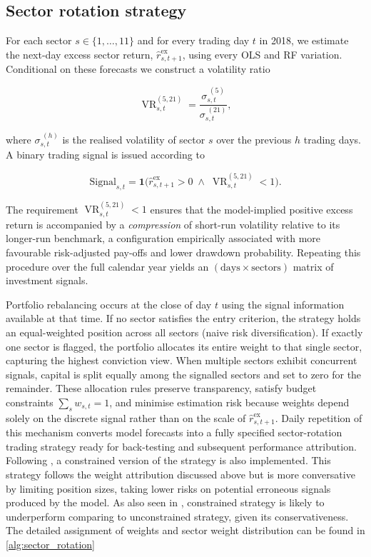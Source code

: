 \subsection{Sector rotation strategy}

For each sector $s\in\{1,\dots,11\}$ and for every trading day $t$ in 2018, we estimate the next-day excess sector return, $\widehat{r}^{\text{ex}}_{s,t+1}$, using every OLS and RF variation. Conditional on these forecasts we construct a volatility ratio

\begin{equation}
\operatorname{VR}_{s,t}^{(5,21)}=\frac{\sigma_{s,t}^{\;(5)}}{\sigma_{s,t}^{\;(21)}},
\end{equation}

where $\sigma_{s,t}^{\;(h)}$ is the realised volatility of sector $s$ over the previous $h$ trading days.  A binary trading signal is issued according to

\begin{equation}
\text{Signal}_{s,t}=\mathbf{1}
\!\bigl(
\widehat{r}^{\text{ex}}_{s,t+1}>0
\;\wedge\;
\operatorname{VR}_{s,t}^{(5,21)}<1
\bigr).
\end{equation}

The requirement $\operatorname{VR}_{s,t}^{(5,21)}<1$ ensures that the model-implied positive excess return is accompanied by a \emph{compression} of short-run volatility relative to its longer-run benchmark, a configuration empirically associated with more favourable risk-adjusted pay-offs and lower drawdown probability.  Repeating this procedure over the full calendar year yields an $(\text{days}\times\text{sectors})$ matrix of investment signals.

Portfolio rebalancing occurs at the close of day $t$ using the signal information available at that time.  If no sector satisfies the entry criterion, the strategy holds an equal-weighted position across all sectors (naive risk diversification).  If exactly one sector is flagged, the portfolio allocates its entire weight to that single sector, capturing the highest conviction view.  When multiple sectors exhibit concurrent signals, capital is split equally among the signalled sectors and set to zero for the remainder. These allocation rules preserve transparency, satisfy budget constraints $\sum_{s}w_{s,t}=1$, and minimise estimation risk because weights depend solely on the discrete signal rather than on the scale of $\widehat{r}^{\text{ex}}_{s,t+1}$.  Daily repetition of this mechanism converts model forecasts into a fully specified sector-rotation trading strategy ready for back-testing and subsequent performance attribution. Following , a constrained version of the strategy is also implemented. This strategy follows the weight attribution discussed above but is more conversative by limiting position sizes, taking lower risks on potential erroneous signals produced by the model. As also seen in , constrained strategy is likely to underperform comparing to unconstrained strategy, given its conservativeness. The detailed assignment of weights and sector weight distribution can be found in \cref{alg:sector_rotation}

